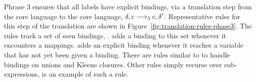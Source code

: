 Phrase 3 ensures that all labels have explicit bindings,
via a translation step from the core language to the core language,
$\delta, c \longrightarrow_3 c, \delta'$.
Representative rules for this step of the translation
are shown in Figure~\ref{fig:translation-rules-phase3}.
The rules track a set of seen bindings,
\context.
\ThrBind
adds a binding to this set whenever it encounters a mappings.
\UnknownLabel
adds an explicit binding whenever it reaches a variable
that has not yet been given a binding.
There are rules similar to \UnknownLabel to handle
bindings on unions and Kleene closures.
Other rules
simply recurse over sub-expressions,
\ThrCons is an example of such a rule.





